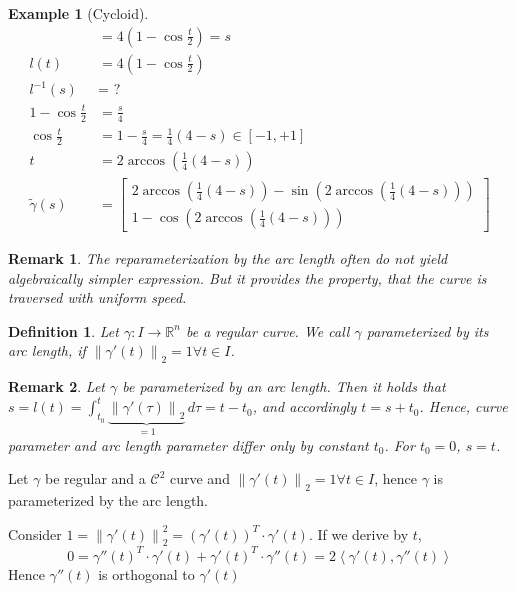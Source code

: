 \documentclass{article}
\newtheorem{example}{Example}  \numberwithin{example}{section}
\newtheorem{definition}{Definition}  \numberwithin{definition}{section}
\newtheorem{remark}{Remark}  \numberwithin{remark}{section}
\newcommand{\angel}[1]{\left\langle#1\right\rangle}
\newcommand{\norm}[1]{\left\|#1\right\|}
\begin{document}
\begin{example}[Cycloid]
\begin{align*}
      &= 4 (1 - \cos\frac t2) = s \\
    l(t) &= 4 (1 - \cos\frac t2) \\
    l^{-1}(s) &= \text{ ?} \\
    1 - \cos\frac t2 &= \frac s4 \\
    \cos\frac t2 &= 1 - \frac s4 = \frac14 (4 - s) \in [-1, +1] \\
    t &= 2 \arccos\left(\frac14 (4 - s)\right) \\
    \tilde \gamma(s) &= \begin{bmatrix} 2 \arccos(\frac14 (4 - s)) - \sin(2 \arccos(\frac14 (4 - s))) \\ 1 - \cos(2 \arccos(\frac14(4 - s))) \end{bmatrix}
  \end{align*}
\end{example}

\begin{remark}
  The reparameterization by the arc length often do not yield algebraically simpler expression.
  But it provides the property, that the curve is traversed with uniform speed.
\end{remark}

\begin{definition} %
  Let $\gamma: I \to \mathbb R^n$ be a regular curve.
  We call $\gamma$ \emph{parameterized by its arc length}, if $\norm{\gamma'(t)}_2 = 1 \forall t \in I$.
\end{definition}

\begin{remark}
  Let $\gamma$ be parameterized by an arc length.
  Then it holds that $s = l(t) = \int_{t_0}^t \underbrace{\norm{\gamma'(\tau)}_2}_{=1} \, d\tau = t - t_0$, and accordingly $t = s + t_0$.
  Hence, curve parameter and arc length parameter differ only by constant $t_0$. For $t_0 = 0$, $s = t$.
\end{remark}

Let $\gamma$ be regular and a $\mathcal C^2$ curve and $\norm{\gamma'(t)}_2 = 1 \forall t \in I$, hence $\gamma$ is parameterized by the arc length.

Consider $1 = \norm{\gamma'(t)}_2^2 = \left(\gamma'(t)\right)^T \cdot \gamma'(t)$. If we derive by $t$,
\[ 0 = \gamma''(t)^T \cdot \gamma'(t) + \gamma'(t)^T \cdot \gamma''(t) = 2 \angel{\gamma'(t), \gamma''(t)} \]
Hence $\gamma''(t)$ is orthogonal to $\gamma'(t)$

\end{document}
